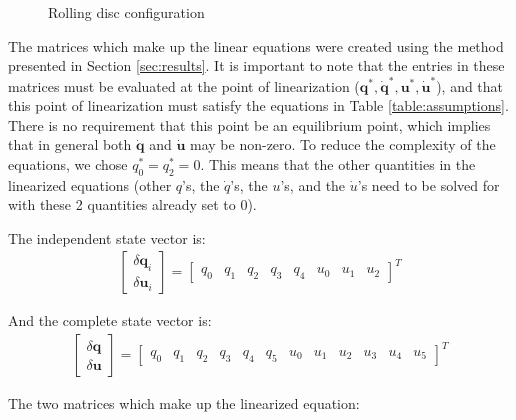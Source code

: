 \documentclass[smallcondensed]{svjour3}                     %
\begin{document}
\begin{figure}
  \centering
  
  \caption{Rolling disc configuration}
  \label{fig:disc}
\end{figure}



The matrices which make up the linear equations were created using the method
presented in Section \ref{sec:results}. It is important to note that the
entries in these matrices must be evaluated at the point of linearization
($\bm{q}^*, \bm{\dot{q}}^*, \bm{u}^*, \bm{\dot{u}}^*$), and that this point of
linearization must satisfy the equations in Table \ref{table:assumptions}.
There is no requirement that this point be an equilibrium point, which implies
that in general both $\bm{\dot{q}}$ and $\bm{\dot{u}}$ may be non-zero. To
reduce the complexity of the equations, we chose $q_0^* = q_2^* = 0$.  This
means that the other quantities in the linearized equations (other $q$'s, the
$\dot{q}$'s, the $u$'s, and the $\dot{u}$'s need to be solved for with these 2
quantities already set to 0).

The independent state vector is:
\begin{align}
\begin{bmatrix}
\delta \bm{q}_i \\
\delta \bm{u}_i
\end{bmatrix} =
\begin{bmatrix}
q_0 &
q_1 &
q_2 &
q_3 &
q_4 &
u_0 &
u_1 &
u_2
\end{bmatrix}^T
\end{align}

And the complete state vector is:
\begin{align}
\begin{bmatrix}
\delta \bm{q} \\
\delta \bm{u}
\end{bmatrix} =
\left[
\begin{array}{cccccccccccc}
q_0 &
q_1 &
q_2 &
q_3 &
q_4 &
q_5 &
u_0 &
u_1 &
u_2 &
u_3 &
u_4 &
u_5
\end{array}
\right]^T
\end{align}

The two matrices which make up the linearized equation:
\end{document}
